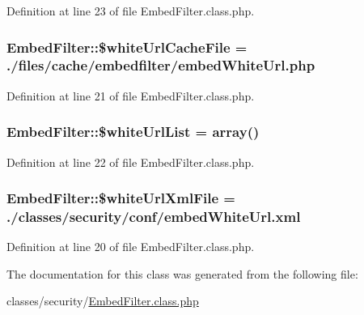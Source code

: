 Definition at line 23 of file Embed\+Filter.\+class.\+php.

\subsubsection[{\texorpdfstring{\$white\+Url\+Cache\+File}{$whiteUrlCacheFile}}]{\setlength{\rightskip}{0pt plus 5cm}Embed\+Filter\+::\$white\+Url\+Cache\+File = \textquotesingle{}./{\bf files}/cache/embedfilter/embed\+White\+Url.\+php\textquotesingle{}}\hypertarget{classEmbedFilter_a2c04bd8059ab27b14923923317ad0756}{}\label{classEmbedFilter_a2c04bd8059ab27b14923923317ad0756}


Definition at line 21 of file Embed\+Filter.\+class.\+php.

\subsubsection[{\texorpdfstring{\$white\+Url\+List}{$whiteUrlList}}]{\setlength{\rightskip}{0pt plus 5cm}Embed\+Filter\+::\$white\+Url\+List = array()}\hypertarget{classEmbedFilter_a3c991ef8c125e62213cc5c686712be8f}{}\label{classEmbedFilter_a3c991ef8c125e62213cc5c686712be8f}


Definition at line 22 of file Embed\+Filter.\+class.\+php.

\subsubsection[{\texorpdfstring{\$white\+Url\+Xml\+File}{$whiteUrlXmlFile}}]{\setlength{\rightskip}{0pt plus 5cm}Embed\+Filter\+::\$white\+Url\+Xml\+File = \textquotesingle{}./classes/security/conf/embed\+White\+Url.\+xml\textquotesingle{}}\hypertarget{classEmbedFilter_aad143e16d225c65d096f44b325744c89}{}\label{classEmbedFilter_aad143e16d225c65d096f44b325744c89}


Definition at line 20 of file Embed\+Filter.\+class.\+php.



The documentation for this class was generated from the following file\+:\begin{DoxyCompactItemize}
\item 
classes/security/\hyperlink{EmbedFilter_8class_8php}{Embed\+Filter.\+class.\+php}\end{DoxyCompactItemize}
